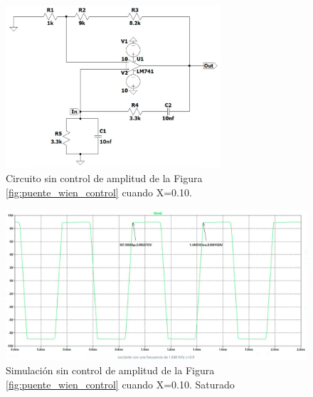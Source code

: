 \begin{enumerate}
\begin{itemize}
                    \begin{figure}[H]
                        \centering
                        \setcounter{figure}{7}
                        \includegraphics[width=8cm]
                        {Imagenes/sim_cir_puente_wien_sc9.png}
                        \caption{Circuito sin control de amplitud de la Figura \ref{fig:puente_wien_control} cuando X=0.10.}
                        \label{fig:sim_cir_puente_wien_sc9}
                    \end{figure}

                    \begin{figure}[H]
                        \centering
                        \renewcommand{\figurename}{Gráfica}
                        \setcounter{figure}{3}
                        \includegraphics[width=15cm]{Imagenes/sim_puente_wien_sc9.png}
                        \caption{Simulación sin control de amplitud de la Figura \ref{fig:puente_wien_control} cuando X=0.10. Saturado}
                        \label{fig:sim_puente_wien_sc9}
                    \end{figure}


\end{itemize}
\end{enumerate}
